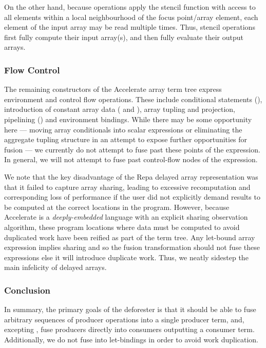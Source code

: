 On the other hand, because  operations apply the stencil
function with access to all elements within a local neighbourhood of the focus
point/array element, each element of the input array may be read multiple times.
Thus, stencil operations first fully compute their input array(s), and then
fully evaluate their output arrays.


\subsubsection{Flow Control}

The remaining constructors of the Accelerate array term tree express environment
and control flow operations. These include conditional statements
(), introduction of constant array data ( and
), array tupling and projection, pipelining (\code{>->}) and
environment bindings. While there may be some opportunity here --- moving array
conditionals into scalar expressions or eliminating the aggregate tupling
structure in an attempt to expose further opportunities for fusion --- we
currently do not attempt to fuse past these points of the expression. In
general, we will not attempt to fuse past control-flow nodes of the expression.

We note that the key disadvantage of the Repa delayed array representation was
that it failed to capture array sharing, leading to excessive recomputation and
corresponding loss of performance if the user did not explicitly demand results
to be computed at the correct locations in the program. However, because
Accelerate is a \emph{deeply-embedded} language with an explicit sharing
observation algorithm, these program locations where data must be computed to
avoid duplicated work have been reified as part of the term tree. Any
let-bound array expression implies sharing and so the fusion transformation
should not fuse these expressions else it will introduce duplicate work. Thus,
we neatly sidestep the main infelicity of delayed arrays.


\subsubsection{Conclusion}

In summary, the primary goals of the deforester is that it should be able to
fuse arbitrary sequences of producer operations into a single producer term,
and, excepting , fuse producers directly into consumers
outputting a consumer term. Additionally, we do not fuse into
let-bindings in order to avoid work duplication.

